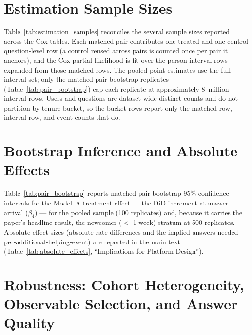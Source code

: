 \section{Estimation Sample Sizes}
\label{sec:estimation_samples}

Table~\ref{tab:estimation_samples} reconciles the several sample sizes reported across the Cox tables. Each matched pair contributes one treated and one control question-level row (a control reused across pairs is counted once per pair it anchors), and the Cox partial likelihood is fit over the person-interval rows expanded from those matched rows. The pooled point estimates use the full interval set; only the matched-pair bootstrap replicates (Table~\ref{tab:pair_bootstrap}) cap each replicate at approximately 8~million interval rows. Users and questions are dataset-wide distinct counts and do not partition by tenure bucket, so the bucket rows report only the matched-row, interval-row, and event counts that do.


\section{Bootstrap Inference and Absolute Effects}
\label{sec:selection_absolute}

Table~\ref{tab:pair_bootstrap} reports matched-pair bootstrap 95\% confidence intervals for the Model~A treatment effect --- the DiD increment at answer arrival ($\beta_4$) --- for the pooled sample (100 replicates) and, because it carries the paper's headline result, the newcomer ($<$ 1 week) stratum at 500 replicates. Absolute effect sizes (absolute rate differences and the implied answers-needed-per-additional-helping-event) are reported in the main text (Table~\ref{tab:absolute_effects}, ``Implications for Platform Design'').


\section{Robustness: Cohort Heterogeneity, Observable Selection, and Answer Quality}
\label{sec:robustness_revision}

